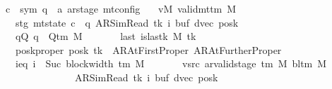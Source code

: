 \begin{isabellebody}
\ \ \ \ \ c{\isacharprime}{\kern0pt}\ {\isacharcolon}{\kern0pt}{\isacharcolon}{\kern0pt}\ {\isachardoublequoteopen}{\isacharparenleft}{\kern0pt}sym{}{\isacharcomma}{\kern0pt}\ {\isacharprime}{\kern0pt}q\ {\isasymtimes}\ {\isacharprime}{\kern0pt}a\ ar{\isacharunderscore}{\kern0pt}stage{\isacharparenright}{\kern0pt}\ mt{\isacharunderscore}{\kern0pt}config{\isachardoublequoteclose}\isanewline
\ \ \ vM{\isacharcolon}{\kern0pt}\ {\isachardoublequoteopen}valid{\isacharunderscore}{\kern0pt}mttm\ M{\isachardoublequoteclose}\isanewline
\ \ \ \ \ \ \ stg{\isacharcolon}{\kern0pt}\ {\isachardoublequoteopen}mt{\isacharunderscore}{\kern0pt}state\ c{\isacharprime}{\kern0pt}\ {\isacharequal}{\kern0pt}\ {\isacharparenleft}{\kern0pt}q{\isacharcomma}{\kern0pt}\ AR{\isacharunderscore}{\kern0pt}SimRead{\isacharcomma}{\kern0pt}\ tk{\isacharcomma}{\kern0pt}\ i{\isacharcomma}{\kern0pt}\ buf{\isacharcomma}{\kern0pt}\ dvec{\isacharcomma}{\kern0pt}\ posk{\isacharparenright}{\kern0pt}{\isachardoublequoteclose}\isanewline
\ \ \ \ \ \ \ qQ{\isacharcolon}{\kern0pt}\ {\isachardoublequoteopen}q\ {\isasymin}\ Q{\isacharunderscore}{\kern0pt}tm\ M{\isachardoublequoteclose}\isanewline
\ \ \ \ \ \ \ last{\isacharcolon}{\kern0pt}\ {\isachardoublequoteopen}is{\isacharunderscore}{\kern0pt}last{\isacharunderscore}{\kern0pt}k\ M\ tk{\isachardoublequoteclose}\isanewline
\ \ \ \ \ \ \ posk{\isacharunderscore}{\kern0pt}proper{\isacharcolon}{\kern0pt}\ {\isachardoublequoteopen}posk\ tk\ {\isasymin}\ {\isacharbraceleft}{\kern0pt}AR{\isacharunderscore}{\kern0pt}AtFirstProper{\isacharcomma}{\kern0pt}\ AR{\isacharunderscore}{\kern0pt}AtFurtherProper{\isacharbraceright}{\kern0pt}{\isachardoublequoteclose}\isanewline
\ \ \ \ \ \ \ ieq{\isacharcolon}{\kern0pt}\ {\isachardoublequoteopen}i\ {\isacharequal}{\kern0pt}\ Suc\ {\isacharparenleft}{\kern0pt}block{\isacharunderscore}{\kern0pt}width\ {\isacharparenleft}{\kern0pt}{\isasymGamma}{\isacharunderscore}{\kern0pt}tm\ M{\isacharparenright}{\kern0pt}{\isacharparenright}{\kern0pt}{\isachardoublequoteclose}\isanewline
\ \ \ \ \ \ \ vsrc{\isacharcolon}{\kern0pt}\ {\isachardoublequoteopen}ar{\isacharunderscore}{\kern0pt}valid{\isacharunderscore}{\kern0pt}stage\ {\isacharparenleft}{\kern0pt}{\isasymGamma}{\isacharunderscore}{\kern0pt}tm\ M{\isacharparenright}{\kern0pt}\ {\isacharparenleft}{\kern0pt}bl{\isacharunderscore}{\kern0pt}tm\ M{\isacharparenright}{\kern0pt}\isanewline
\ \ \ \ \ \ \ \ \ \ \ \ \ \ \ \ \ \ \ {\isacharparenleft}{\kern0pt}AR{\isacharunderscore}{\kern0pt}SimRead{\isacharcomma}{\kern0pt}\ tk{\isacharcomma}{\kern0pt}\ i{\isacharcomma}{\kern0pt}\ buf{\isacharcomma}{\kern0pt}\ dvec{\isacharcomma}{\kern0pt}\ posk{\isacharparenright}{\kern0pt}{\isachardoublequoteclose}\isanewline

\end{isabellebody}
